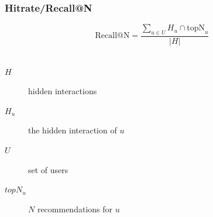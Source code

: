 \documentclass[mathserif,svgnames]{beamer}
\begin{document}
\begin{frame} 
\frametitle{Hitrate/Recall@N~\cite{Karypis:2001:EIT:502585.502627, Sarwar00applicationof}}
\begin{equation} 
\text{Recall@N}=\frac{\sum_{u \in U} H_u \cap \text{topN}_u}{|H|}
\end{equation}\\
\vspace{6.4mm}
\begin{description}
    \item[$H$] hidden interactions\\
    \item[$H_u$] the hidden interaction of $u$\\
    \item[$U$] set of users
    \item[$topN_u$] $N$ recommendations for $u$
\end{description}
\end{frame}
\end{document}

